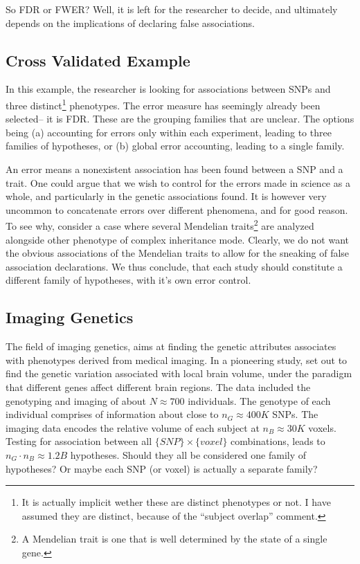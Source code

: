 \documentclass[review,12pt]{article}
\begin{document}
So FDR or FWER? Well, it is left for the researcher to decide, and ultimately depends on the implications of declaring false associations. 





\subsection{\label{sec:cross_validated}Cross Validated Example}

In this example, the researcher is looking for associations between SNPs and three distinct\footnote{ It is actually implicit wether these are distinct phenotypes or not. I have assumed they are distinct, because of the ``subject overlap'' comment.} phenotypes. The error measure has seemingly already been selected-- it is FDR. These are the grouping families that are unclear. 
The options being (a) accounting for errors only within each experiment, leading to three families of hypotheses, or (b) global error accounting, leading to a single family. 

An error means a nonexistent association has been found between a SNP and a trait. One could argue that we wish to control for the errors made in science as a whole, and particularly in the genetic associations found. It is however very uncommon to concatenate errors over different phenomena, and for good reason. 
To see why, consider a case where several Mendelian traits\footnote{ A Mendelian trait is one that is well determined by the state of a single gene.} are analyzed alongside other phenotype of complex inheritance mode. Clearly, we do not want the obvious associations of the Mendelian traits to allow for the sneaking of false association declarations. We thus conclude, that each study should constitute a different family of hypotheses, with it's own error control.






\subsection{\label{eg:imaging_genetics}Imaging Genetics}

The field of imaging genetics, aims at finding the genetic attributes associates with phenotypes derived from medical imaging. In a pioneering study, \citet{stein_voxelwise_2010} set out to find the genetic variation associated with local brain volume, under the paradigm that different genes affect different brain regions. 
The data included the genotyping and imaging of about $N \approx 700$ individuals. 
The genotype of each individual comprises of information about close to $n_G \approx 400K$ SNPs. 
The imaging data encodes the relative volume of each subject at $n_B \approx 30K$ voxels. 
Testing for association between all $\{SNP\} \times \{voxel\}$ combinations, leads to $n_G \cdot n_B \approx 1.2B$ hypotheses. Should they all be considered one family of hypotheses? Or maybe each SNP (or voxel) is actually a separate family? 
\end{document}
